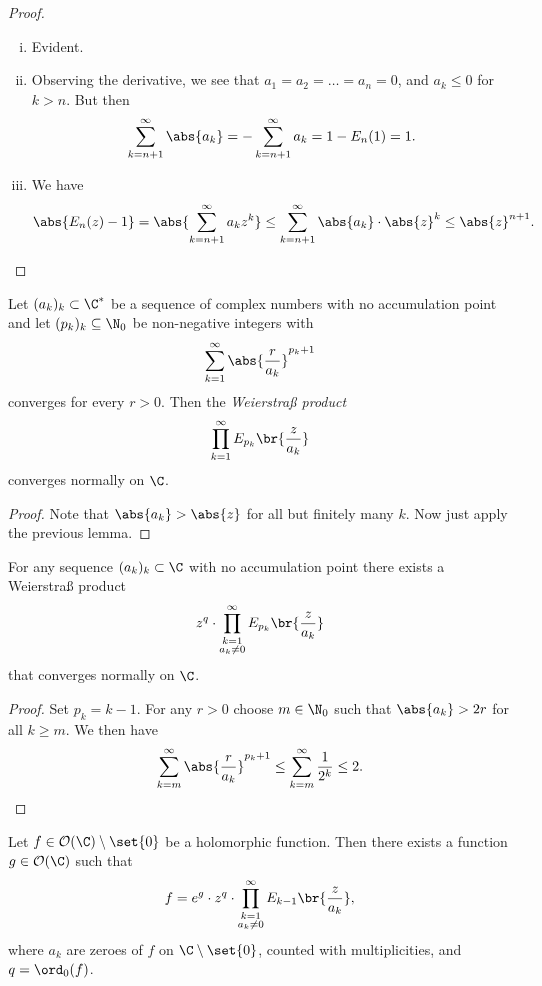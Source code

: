 \begin{proof}
\phantom{i}
\begin{enumerate}[i)]
\item Evident.
\item Observing the derivative, we see that
$a_1 = a_2 = \dots = a_n = 0$, and $a_k \leq 0$ for $k > n$. But
then
\[
\sum_{k=n+1}^\infty \abs{a_k} =
-\sum_{k=n+1}^\infty a_k =
1 - E_n(1) =
1.
\]
\item We have
\[
\abs{E_n(z) - 1} =
\abs{\sum_{k=n+1}^\infty a_k z^k} \leq
\sum_{k=n+1}^\infty \abs{a_k} \cdot \abs{z}^k \leq
\abs{z}^{n+1}. \qedhere
\]
\end{enumerate}
\end{proof}

\begin{lema}
Let $(a_k)_k \subset \C^*$ be a sequence of complex numbers with no
accumulation point and let $(p_k)_k \subseteq \N_0$ be non-negative
integers with
\[
\sum_{k=1}^\infty \abs{\frac{r}{a_k}}^{p_k+1}
\]
converges for every $r > 0$. Then the
\emph{Weierstraß product}
\[
\prod_{k=1}^\infty E_{p_k} \br{\frac{z}{a_k}}
\]
converges normally on $\C$.
\end{lema}

\begin{proof}
Note that $\abs{a_k} > \abs{z}$ for all but finitely many $k$. Now
just apply the previous lemma.
\end{proof}

\begin{izrek}
For any sequence $(a_k)_k \subset \C$ with no accumulation point
there exists a Weierstraß product
\[
z^q \cdot \prod_{\substack{k=1 \\ a_k \ne 0}}^\infty
E_{p_k} \br{\frac{z}{a_k}}
\]
that converges normally on $\C$.
\end{izrek}

\begin{proof}
Set $p_k = k-1$. For any $r > 0$ choose $m \in \N_0$ such that
$\abs{a_k} > 2r$ for all $k \geq m$. We then have
\[
\sum_{k=m}^\infty \abs{\frac{r}{a_k}}^{p_k+1} \leq
\sum_{k=m}^\infty \frac{1}{2^k} \leq
2. \qedhere
\]
\end{proof}

\begin{izrek}
\label{inf_prod:thm:w_prod_1}
Let $f \in \mathcal{O}(\C) \setminus \set{0}$ be a holomorphic
function. Then there exists a function $g \in \mathcal{O}(\C)$ such
that
\[
f = e^g \cdot z^q \cdot \prod_{\substack{k=1 \\ a_k \ne 0}}^\infty
E_{k-1} \br{\frac{z}{a_k}},
\]
where $a_k$ are zeroes of $f$ on $\C \setminus \set{0}$, counted
with multiplicities, and $q = \ord_0(f)$.
\end{izrek}

